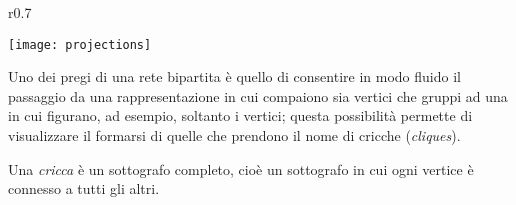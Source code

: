 \begin{wrapfigure}{r}{0.7\textwidth}
	\begin{center}
		\texttt{[image: projections]}
	\end{center}
	\caption{
	\cite{Newman}}
	\label{fig:projs}
\end{wrapfigure}
	Uno dei pregi di una rete bipartita è quello di consentire in modo fluido il passaggio da una rappresentazione in cui compaiono sia vertici che gruppi ad una in cui figurano, ad esempio, soltanto i vertici; questa possibilità permette di visualizzare il formarsi di quelle che prendono il nome di cricche (\emph{cliques}).
\begin{definizione} \cite{Bickle}
Una \emph{cricca} è un sottografo completo, cioè un sottografo in cui ogni vertice è connesso a tutti gli altri.
\end{definizione}
	



